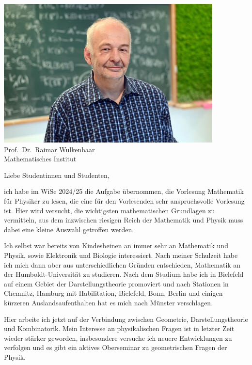 \begin{multicols}{2}
\begin{multicols}{2}
\begin{center}
	\includegraphics[width=\columnwidth, height=0.35\textheight]{res/vorstellungsfotos/Hille.jpg}\\
	\smallskip
 	Prof.\ Dr.\ Raimar Wulkenhaar\\
	Mathematisches Institut
\end{center}
Liebe Studentinnen und Studenten,

ich habe im WiSe 2024/25 die Aufgabe übernommen, die Vorlesung Mathematik für Physiker zu lesen, die eine für den Vorlesenden sehr anspruchsvolle Vorlesung ist. Hier wird versucht, die wichtigsten mathematischen Grundlagen zu vermitteln, aus dem inzwischen riesigen Reich der Mathematik und Physik muss dabei eine kleine Auswahl getroffen werden.

Ich selbst war bereits von Kindesbeinen an immer sehr an Mathematik und Physik, sowie Elektronik und Biologie interessiert. Nach meiner Schulzeit habe ich mich dann aber aus unterschiedlichen Gründen entschieden, Mathematik an der Humboldt-Universität zu studieren. Nach dem Studium habe ich in Bielefeld auf einem Gebiet der Darstellungstheorie promoviert und nach Stationen in Chemnitz, Hamburg mit Habilitation, Bielefeld, Bonn, Berlin und einigen kürzeren Auslandsaufenthalten hat es mich nach Münster verschlagen.

Hier arbeite ich jetzt auf der Verbindung zwischen Geometrie, Darstellungstheorie und Kombinatorik. Mein Interesse an physikalischen Fragen ist in letzter Zeit wieder stärker geworden, insbesondere versuche ich neuere Entwicklungen zu verfolgen und es gibt ein aktives Oberseminar zu geometrischen Fragen der Physik.


\end{multicols}
\end{multicols}
